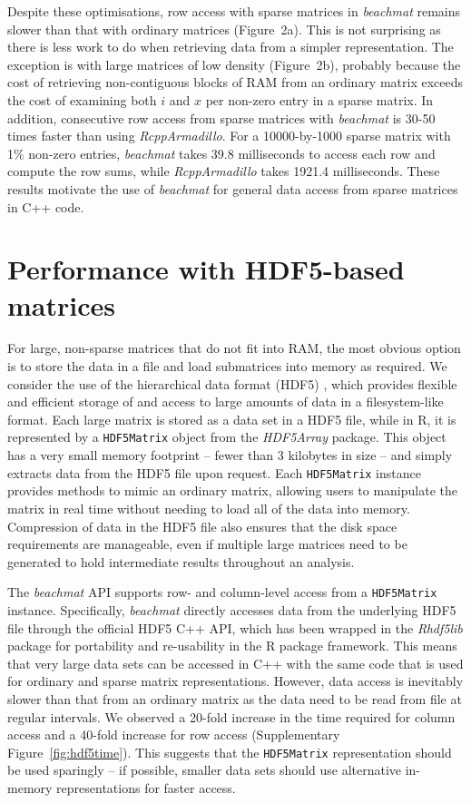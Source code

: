 \documentclass{article}
\newcommand{\beachmat}{\textit{beachmat}}
\newcommand{\code}[1]{\texttt{#1}}
\begin{document}
Despite these optimisations, row access with sparse matrices in \beachmat{} remains slower than that with ordinary matrices (Figure~2a).
This is not surprising as there is less work to do when retrieving data from a simpler representation.
The exception is with large matrices of low density (Figure~2b), probably because the cost of retrieving non-contiguous blocks of RAM from an ordinary matrix exceeds the cost of examining both $i$ and $x$ per non-zero entry in a sparse matrix.
In addition, consecutive row access from sparse matrices with \beachmat{} is 30-50 times faster than using \textit{RcppArmadillo}.
For a 10000-by-1000 sparse matrix with 1\% non-zero entries, \beachmat{} takes 39.8 milliseconds to access each row and compute the row sums, while \textit{RcppArmadillo} takes 1921.4 milliseconds.
These results motivate the use of \beachmat{} for general data access from sparse matrices in C++ code.

\section{Performance with HDF5-based matrices}
For large, non-sparse matrices that do not fit into RAM, the most obvious option is to store the data in a file and load submatrices into memory as required.
We consider the use of the hierarchical data format (HDF5) \cite{hdf5}, which provides flexible and efficient storage of and access to large amounts of data in a filesystem-like format.
Each large matrix is stored as a data set in a HDF5 file, while in R, it is represented by a \code{HDF5Matrix} object from the \textit{HDF5Array} package.
This object has a very small memory footprint -- fewer than 3 kilobytes in size -- and simply extracts data from the HDF5 file upon request.
Each \code{HDF5Matrix} instance provides methods to mimic an ordinary matrix, allowing users to manipulate the matrix in real time without needing to load all of the data into memory.
Compression of data in the HDF5 file also ensures that the disk space requirements are manageable, even if multiple large matrices need to be generated to hold intermediate results throughout an analysis.

The \beachmat{} API supports row- and column-level access from a \code{HDF5Matrix} instance.
Specifically, \beachmat{} directly accesses data from the underlying HDF5 file through the official HDF5 C++ API, which has been wrapped in the \textit{Rhdf5lib} package for portability and re-usability in the R package framework.
This means that very large data sets can be accessed in C++ with the same code that is used for ordinary and sparse matrix representations.
However, data access is inevitably slower than that from an ordinary matrix as the data need to be read from file at regular intervals.
We observed a 20-fold increase in the time required for column access and a 40-fold increase for row access (Supplementary Figure~\ref{fig:hdf5time}).
This suggests that the \code{HDF5Matrix} representation should be used sparingly -- if possible, smaller data sets should use alternative in-memory representations for faster access.
\end{document}
